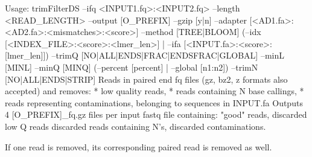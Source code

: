 \begin{DoxyCode}
Usage: trimFilterDS --ifq <INPUT1.fq>:<INPUT2.fq> --length <READ\_LENGTH>
                  --output [O\_PREFIX] --gzip [y|n]
                  --adapter [<AD1.fa>:<AD2.fa>:<mismatches>:<score>]
                  --method [TREE|BLOOM]
                  (--idx [<INDEX\_FILE>:<score>:<lmer\_len>] |
                   --ifa [<INPUT.fa>:<score>:[lmer\_len]])
                  --trimQ [NO|ALL|ENDS|FRAC|ENDSFRAC|GLOBAL]
                  --minL [MINL]  --minQ [MINQ]
                  (--percent [percent] | --global [n1:n2])
                  --trimN [NO|ALL|ENDS|STRIP]
Reads in paired end fq files (gz, bz2, z formats also accepted) and removes:
  * low quality reads,
  * reads containing N base callings,
  * reads representing contaminations, belonging to sequences in INPUT.fa
Outputs 4 [O\_PREFIX]\_fq.gz files per input fastq file containing: "good" reads,
discarded low Q reads discarded reads containing N's, discarded contaminations.

If one read is removed, its corresponding paired read is removed as well.


\end{DoxyCode}

